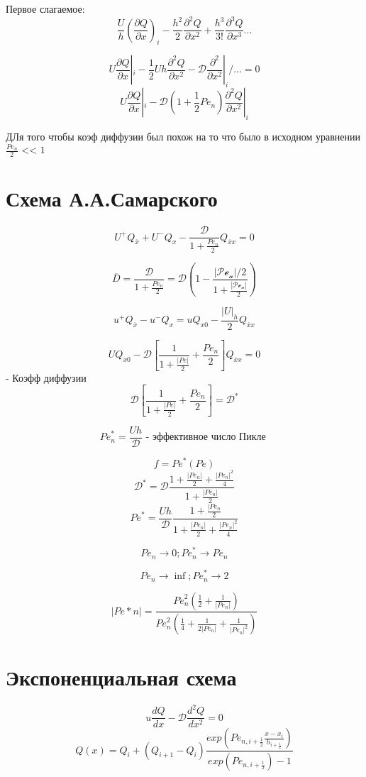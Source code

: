 \documentclass[14pt]{extarticle}
\begin{document}
Первое слагаемое:
\[ \frac{U }{h }{(\frac{\partial Q }{\partial x})}_i - \frac{h^2}{2} \frac{\partial^2 Q }{\partial x^2} + \frac{h^3}{3!} \frac{\partial^3 Q }{\partial x^3} ... \]

\[ U \frac{\partial Q}{\partial x}|_i-\frac{1}{2}Uh \frac{\partial^2Q }{\partial x^2} - \mathcal{D} \frac{\partial^2}{\partial x^2}|_i/... = 0 \]
\[ U \frac{\partial Q}{\partial x}|_i - \mathcal{D}(1+\frac{1}{2} {Pe}_n)\frac{\partial^2 Q }{\partial x^2}|_i \]

ДЛя того чтобы коэф диффузии был похож на то что было в исходном уравнении $ \frac{{Pe}_n}{2} \textrm{ << } 1 $

\section{Схема А.А.Самарского}

\[ U^+Q_{\overline{x}} + U^- Q_x - \frac{\mathcal{D }}{1 + \frac{{Pe}_n }{2}} Q_{\overline{x}x} = 0 \]

\[ \overline{D} = \frac{\mathcal{D }}{1 + \frac{{Pe}_n}{2}} = \mathcal{D(1- \frac{|{Pe}_n| /2}{1+\frac{|{Pe}_n| }{2}})} \]

\[ u^+ Q_{\overline{x}} - u^-Q_x = u Q_{x0} - \frac{|U|_h}{2}Q_{\overline{x} x}\]

\[ U Q_{x0} - \mathcal{D} [\frac{1}{1+\frac{|Pe|}{2}}+\frac{{Pe}_n }{2}]Q_{\overline{x}x} = 0 \]
- Коэфф диффузии 
\[ \mathcal{D} [\frac{1}{1+\frac{|Pe|}{2}}+\frac{{Pe}_n }{2}] = \mathcal{D}^* \]

\[ {Pe}^*_n = \frac{Uh }{\mathcal{D }} \textrm{ - эффективное число Пикле } \]

\[ f = {Pe}^*({Pe}) \]
\[ \mathcal{D}^* = \mathcal{D} \frac{1+\frac{|{Pe}_n|}{2}+\frac{|{Pe}_n|^2}{4}}{1+\frac{|{Pe}_n|}{2}} \]
\[ {Pe}^* = \frac{Uh }{\mathcal{D}} \frac{1+\frac{|{Pe}_n }{2}}{1+\frac{|{Pe}_n|}{2}+\frac{|{Pe}_n|^2}{4}} \]

\[ {Pe}_n \rightarrow 0; {Pe}^*_n \rightarrow {Pe}_n  \]

\[ {Pe}_n \rightarrow \inf; {Pe}^*_n \rightarrow 2 \]

\[ |{Pe}*n| = \frac{{Pe}^2_n (\frac{1}{2} + \frac{1}{|{Pe}_n|})}{{Pe}^2_n (\frac{1}{4}+\frac{1}{2|{Pe}_n|}+\frac{1}{|{Pe}_n|^2})} \]

\section{Экспоненциальная схема}

\[ u \frac{dQ }{dx} - \mathcal{D} \frac{d^2Q }{dx^2} = 0 \]
\[ Q(x) = Q_i + {(Q_{i+1} - Q_i)}\frac{{exp({Pe}_{n, i+ \frac{1}{2}}\frac{x-x_i }{h_{i+\frac{1}{2}}})}}{exp({Pe}_{n, i+\frac{1}{2}})-1} \]
\end{document}

